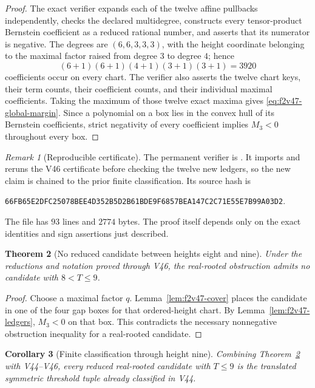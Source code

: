 \documentclass[11pt]{article}
\newtheorem{theorem}{Theorem}[section]
\newtheorem{corollary}[theorem]{Corollary}
\theoremstyle{definition}
\theoremstyle{remark}
\newtheorem{remark}[theorem]{Remark}
\begin{document}
\begin{proof}
The exact verifier expands each of the twelve affine pullbacks independently,
checks the declared multidegree, constructs every tensor-product Bernstein
coefficient as a reduced rational number, and asserts that its numerator is
negative.  The degrees are \((6,6,3,3,3)\), with the height coordinate belonging
to the maximal factor raised from degree \(3\) to degree \(4\); hence
\[
  (6+1)(6+1)(4+1)(3+1)(3+1)=3920
\]
coefficients occur on every chart.  The verifier also asserts the twelve chart
keys, their term counts, their coefficient counts, and their individual maximal
coefficients.  Taking the maximum of those twelve exact maxima gives
\eqref{eq:f2v47-global-margin}.  Since a polynomial on a box lies in the convex
hull of its Bernstein coefficients, strict negativity of every coefficient
implies \(M_3<0\) throughout every box.
\end{proof}

\begin{remark}[Reproducible certificate]
\label{rem:f2v47-verifier}
The permanent verifier is
.
It imports and reruns the V46 certificate before checking the twelve new ledgers,
so the new claim is chained to the prior finite classification.  Its source hash
is
\begin{center}
\texttt{66FB65E2DFC25078BEE4D352B5D2B61BDE9F6857BEA147C2C71E55E7B99A03D2}.
\end{center}
The file has \(93\) lines and \(2774\) bytes.  The proof itself depends only on
the exact identities and sign assertions just described.
\end{remark}

\begin{theorem}[No reduced candidate between heights eight and nine]
\label{thm:f2v47-eight-nine}
Under the reductions and notation proved through V46, the real-rooted obstruction
admits no candidate with \(8<T\leq9\).
\end{theorem}

\begin{proof}
Choose a maximal factor \(q\).  Lemma~\ref{lem:f2v47-cover} places the candidate
in one of the four gap boxes for that ordered-height chart.  By
Lemma~\ref{lem:f2v47-ledgers}, \(M_3<0\) on that box.  This contradicts the
necessary nonnegative obstruction inequality for a real-rooted candidate.
\end{proof}

\begin{corollary}[Finite classification through height nine]
\label{cor:f2v47-through-nine}
Combining Theorem~\ref{thm:f2v47-eight-nine} with V44--V46, every reduced
real-rooted candidate with \(T\leq9\) is the translated symmetric threshold tuple
already classified in V44.
\end{corollary}
\end{document}

